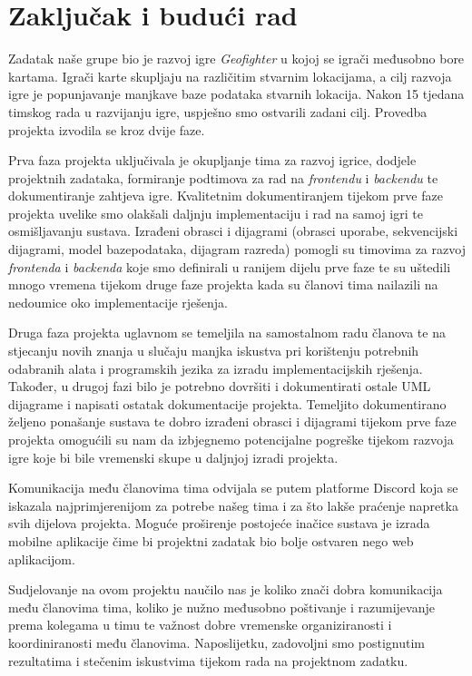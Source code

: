 \chapter{Zaključak i budući rad}
		
		{Zadatak naše grupe bio je razvoj igre \textit{Geofighter} u kojoj se igrači međusobno bore kartama. Igrači karte skupljaju na različitim stvarnim lokacijama, a cilj razvoja igre je popunjavanje manjkave baze podataka stvarnih lokacija. Nakon 15 tjedana timskog rada u razvijanju igre, uspješno smo ostvarili zadani cilj. Provedba projekta izvodila se kroz dvije faze.} 
		
		{Prva faza projekta uključivala je okupljanje tima za razvoj igrice, dodjele projektnih zadataka, formiranje podtimova za rad na \textit{frontendu} i \textit{backendu} te dokumentiranje zahtjeva igre. Kvalitetnim dokumentiranjem tijekom prve faze projekta uvelike smo olakšali daljnju implementaciju i rad na samoj igri te osmišljavanju sustava. Izrađeni obrasci i dijagrami (obrasci uporabe, sekvencijski dijagrami, model bazepodataka, dijagram razreda) pomogli su timovima za razvoj \textit{frontenda} i \textit{backenda} koje smo definirali u ranijem dijelu prve faze te su uštedili mnogo vremena tijekom druge faze projekta kada su članovi tima nailazili na nedoumice oko implementacije rješenja.}
			
		{Druga faza projekta uglavnom se temeljila na samostalnom radu članova te na stjecanju novih znanja u slučaju manjka iskustva pri korištenju potrebnih odabranih alata i programskih jezika za izradu implementacijskih rješenja. Također, u drugoj fazi bilo je potrebno dovršiti i dokumentirati ostale UML dijagrame i napisati ostatak dokumentacije projekta. Temeljito dokumentirano željeno ponašanje sustava te dobro izrađeni obrasci i dijagrami tijekom prve faze projekta omogućili su nam da izbjegnemo potencijalne pogreške tijekom razvoja igre koje bi bile vremenski skupe u daljnjoj izradi projekta.}
		
		{Komunikacija među članovima tima odvijala se putem platforme Discord koja se iskazala najprimjerenijom za potrebe našeg tima i za što lakše praćenje napretka svih dijelova projekta. Moguće proširenje postojeće inačice sustava je izrada mobilne aplikacije čime bi projektni zadatak bio bolje ostvaren nego web aplikacijom.}
		
		{Sudjelovanje na ovom projektu naučilo nas je koliko znači dobra komunikacija među članovima tima, koliko je nužno međusobno poštivanje i razumijevanje prema kolegama u timu te važnost dobre vremenske organiziranosti i koordiniranosti među članovima. Naposlijetku, zadovoljni smo postignutim rezultatima i stečenim iskustvima tijekom rada na projektnom zadatku.}
		
		\eject 